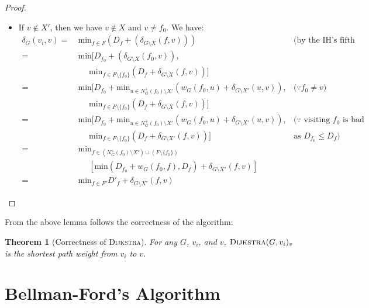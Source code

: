 \documentclass[11pt,a4paper,oneside,microtype,nokorean]{oblivoir}
\newtheorem{theorem}{Theorem}
\begin{document}
\begin{proof}
\begin{itemize}
\begin{itemize}
    \item If $v \notin X'$, then we have $v \notin X$ and $v \neq f_0$.  We have:
      \begin{align*}
        \delta_G(v_i,v) =&~ \textrm{min}_{f \in F} (D_f + (\delta_{G \setminus X}(f,v))) & \mbox{(by the IH's
                                                                                           fifth cond.)} \\
        =&~ \textrm{min} [ D_{f_0} + (\delta_{G \setminus X}(f_0,v)), \\
                         &~ ~~~~~~\textrm{min}_{f \in F \setminus \{f_0\}} (D_f + \delta_{G \setminus X}(f,v)) ] \\
        =&~ \textrm{min} [ D_{f_0} + \textrm{min}_{u \in N^+_G(f_0) \setminus X'}(w_G(f_0,u) + \delta_{G \setminus X'}(u,v)), & \mbox{($\because f_0 \neq v$)} \\
                         &~ ~~~~~~\textrm{min}_{f \in F \setminus \{f_0\}} (D_f + \delta_{G \setminus X}(f,v)) ] \\
        =&~ \textrm{min} [ D_{f_0} + \textrm{min}_{u \in N^+_G(f_0) \setminus X'}(w_G(f_0,u) + \delta_{G \setminus X'}(u,v)), & \mbox{($\because$ visiting $f_0$ is bad} \\
                         &~ ~~~~~~\textrm{min}_{f \in F \setminus \{f_0\}} (D_f + \delta_{G \setminus X'}(f,v)) ] & \mbox{as $D_{f_0} \le D_f$)} \\
        =&~ \textrm{min}_{f \in (N^+_G(f_0) \setminus X') \cup (F \setminus \{f_0\})} \\
        &~ ~~~~~~[\textrm{min}(D_{f_0} + w_G(f_0,f), D_f) + \delta_{G \setminus X'}(f,v)] \\
        =&~ \textrm{min}_{f \in F'} D'_f + \delta_{G \setminus X'}(f,v)
      \end{align*}
    \end{itemize}
  \end{itemize}
\end{proof}


From the above lemma follows the correctness of the algorithm:

\begin{theorem}[Correctness of \textsc{Dijkstra}] For any $G$, $v_i$, and $v$,
  $\textsc{Dijkstra}(G,v_i)_v$ is the shortest path weight from $v_i$ to $v$.
\end{theorem}



\section{Bellman-Ford's Algorithm}
\end{document}
